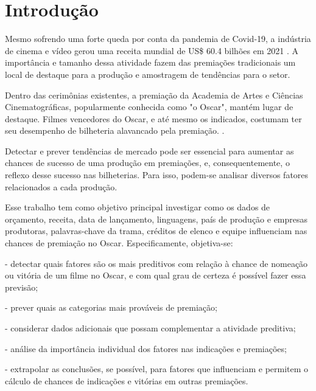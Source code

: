 
\chapter[Introdução]{Introdução}
Mesmo sofrendo uma forte queda por conta da pandemia de Covid-19, a indústria de cinema e vídeo gerou uma receita mundial de US\$ 60.4 bilhões em 2021 \cite{indiantelevision2021}. A importância e tamanho dessa atividade fazem das premiações tradicionais um local de destaque para a produção e amostragem de tendências para o setor.\par
Dentro das cerimônias existentes, a premiação da Academia de Artes e Ciências Cinematográficas, popularmente conhecida como "o Oscar", mantém lugar de destaque. Filmes vencedores do Oscar, e até mesmo os indicados, costumam ter seu desempenho de bilheteria alavancado pela premiação. \cite{hdsr2020}.

Detectar e prever tendências de mercado pode ser essencial para aumentar as chances de sucesso de uma produção em premiações, e, consequentemente, o reflexo desse sucesso nas bilheterias. Para isso, podem-se analisar diversos fatores relacionados a cada produção.\par

Esse trabalho tem como objetivo principal investigar como os dados de orçamento, receita, data de lançamento, linguagens, país de produção e empresas produtoras, palavras-chave da trama, créditos de elenco e equipe influenciam nas chances de premiação no Oscar. Especificamente, objetiva-se:\par

- detectar quais fatores são os mais preditivos com relação à chance de nomeação ou vitória de um filme no Oscar, e com qual grau de certeza é possível fazer essa previsão;\par
- prever quais as categorias mais prováveis de premiação;\par
- considerar dados adicionais que possam complementar a atividade preditiva;\par
- análise da importância individual dos fatores nas indicações e premiações;\par
- extrapolar as conclusões, se possível, para fatores que influenciam e permitem o cálculo de chances de indicações e vitórias em outras premiações.\par
\par


